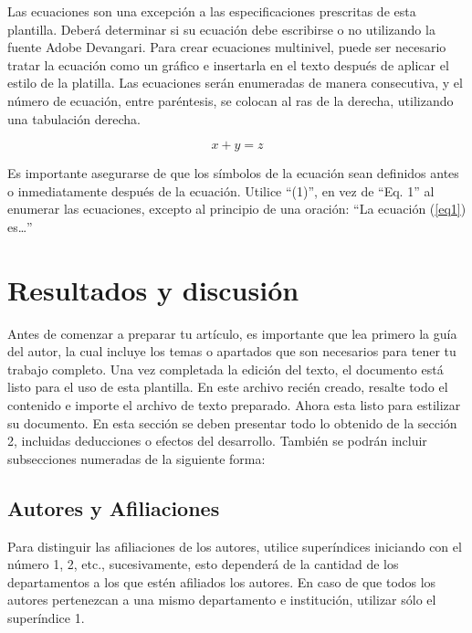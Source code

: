     Las ecuaciones son una excepción a las especificaciones prescritas de esta plantilla. 
    Deberá determinar si su ecuación debe escribirse o no utilizando la fuente Adobe Devangari. 
    Para crear ecuaciones multinivel, puede ser necesario tratar la ecuación como un gráfico e insertarla en el texto después de aplicar el estilo de la platilla.
    Las ecuaciones serán enumeradas de manera consecutiva, y el número de ecuación, entre paréntesis, se colocan al ras de la derecha, utilizando una tabulación derecha. 
    
    \begin{equation}
        \label{eq1}
        x + y = z 
    \end{equation}
    
    Es importante asegurarse de que los símbolos de la ecuación sean definidos antes o inmediatamente después de la ecuación. Utilice “(1)”, en vez de “Eq. 1” al enumerar las ecuaciones, excepto al principio de una oración: “La ecuación (\ref{eq1}) es…”
    
    \section{Resultados y discusión}
    
    Antes de comenzar a preparar tu artículo, es importante que lea primero la guía del autor, la cual incluye los temas o apartados que son necesarios para tener tu trabajo completo.
    Una vez completada la edición del texto, el documento está listo para el uso de esta plantilla. En este archivo recién creado, resalte todo el contenido e importe el archivo de texto preparado. Ahora esta listo para estilizar su documento.
    En esta sección se deben presentar todo lo obtenido de la sección 2, incluidas deducciones o efectos del desarrollo. También se podrán incluir subsecciones numeradas de la siguiente forma:
    
    \subsection{Autores y Afiliaciones}
    
    Para distinguir las afiliaciones de los autores, utilice superíndices iniciando con el número 1, 2, etc., sucesivamente, esto dependerá de la cantidad de los departamentos a los que estén afiliados los autores. En caso de que todos los autores pertenezcan a una mismo departamento e institución, utilizar sólo el superíndice 1. 
    
